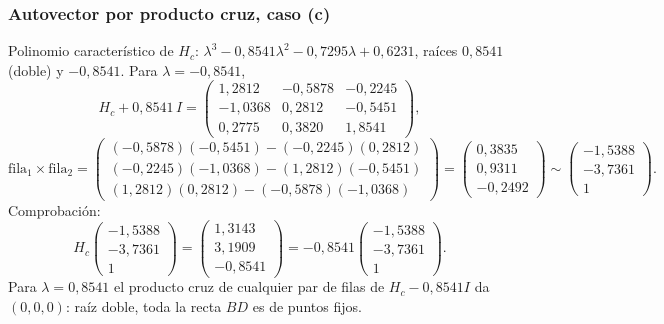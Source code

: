 \subsubsection{Autovector por producto cruz, caso (c)}
Polinomio característico de \(H_c\): \(\lambda^3-0{,}8541\lambda^2-0{,}7295\lambda+0{,}6231\),
raíces \(0{,}8541\) (doble) y \(-0{,}8541\). Para \(\lambda=-0{,}8541\),
\[
H_c+0{,}8541\,I=\begin{pmatrix}1{,}2812&-0{,}5878&-0{,}2245\\-1{,}0368&0{,}2812&-0{,}5451\\0{,}2775&0{,}3820&1{,}8541\end{pmatrix},
\]
\[
\text{fila}_1\times\text{fila}_2=
\begin{pmatrix}(-0{,}5878)(-0{,}5451)-(-0{,}2245)(0{,}2812)\\(-0{,}2245)(-1{,}0368)-(1{,}2812)(-0{,}5451)\\(1{,}2812)(0{,}2812)-(-0{,}5878)(-1{,}0368)\end{pmatrix}
=\begin{pmatrix}0{,}3835\\0{,}9311\\-0{,}2492\end{pmatrix}\sim\begin{pmatrix}-1{,}5388\\-3{,}7361\\1\end{pmatrix}.
\]
Comprobación:
\[
  H_c\begin{pmatrix}-1{,}5388\\-3{,}7361\\1\end{pmatrix}=\begin{pmatrix}1{,}3143\\3{,}1909\\-0{,}8541\end{pmatrix}
  =-0{,}8541\begin{pmatrix}-1{,}5388\\-3{,}7361\\1\end{pmatrix}.
\]
Para \(\lambda=0{,}8541\) el producto cruz de cualquier par de filas de \(H_c-0{,}8541I\) da
\((0,0,0)\): raíz doble, toda la recta \(BD\) es de puntos fijos.

